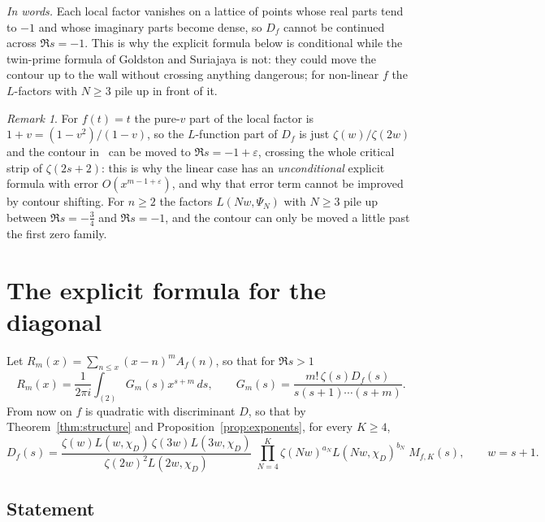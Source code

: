 \documentclass[11pt,a4paper]{article}
\theoremstyle{remark}\newtheorem{remark}[theorem]{Remark}
\begin{document}
\emph{In words.} Each local factor vanishes on a lattice of points whose real parts tend to $-1$ and whose
imaginary parts become dense, so $D_f$ cannot be continued across $\Re s=-1$. This is why the explicit formula
below is conditional while the twin-prime formula of Goldston and Suriajaya is not: they could move the
contour up to the wall without crossing anything dangerous; for non-linear $f$ the $L$-factors with $N\ge3$
pile up in front of it.

\begin{remark}
For $f(t)=t$ the pure-$v$ part of the local factor is $1+v=(1-v^2)/(1-v)$, so the $L$-function part of
$D_f$ is just $\zeta(w)/\zeta(2w)$ and the contour in~\cite{GoldstonSuriajaya2021} can be moved to
$\Re s=-1+\varepsilon$, crossing the whole critical strip of $\zeta(2s+2)$: this is why the linear case has
an \emph{unconditional} explicit formula with error $O(x^{m-1+\varepsilon})$, and why that error term cannot
be improved by contour shifting. For $n\ge2$ the factors $L(Nw,\Psi_N)$ with $N\ge3$ pile up between
$\Re s=-\tfrac34$ and $\Re s=-1$, and the contour can only be moved a little past the first zero family.
\end{remark}

\section{The explicit formula for the diagonal}\label{sec:explicit}

Let $R_m(x)=\sum_{n\le x}(x-n)^mA_f(n)$, so that for $\Re s>1$
\begin{equation}\label{eq:mellin}
R_m(x)=\frac1{2\pi i}\int_{(2)}G_m(s)x^{s+m}\,ds,\qquad G_m(s)=\frac{m!\,\zeta(s)D_f(s)}{s(s+1)\cdots(s+m)}.
\end{equation}
From now on $f$ is quadratic with discriminant $D$, so that by Theorem~\ref{thm:structure} and
Proposition~\ref{prop:exponents}, for every $K\ge4$,
\begin{equation}\label{eq:Dquad}
D_f(s)=\frac{\zeta(w)L(w,\chi_D)\,\zeta(3w)L(3w,\chi_D)}{\zeta(2w)^2L(2w,\chi_D)}\;
\prod_{N=4}^{K}\zeta(Nw)^{a_N}L(Nw,\chi_D)^{b_N}\;M_{f,K}(s),\qquad w=s+1.
\end{equation}

\subsection{Statement}
\end{document}
